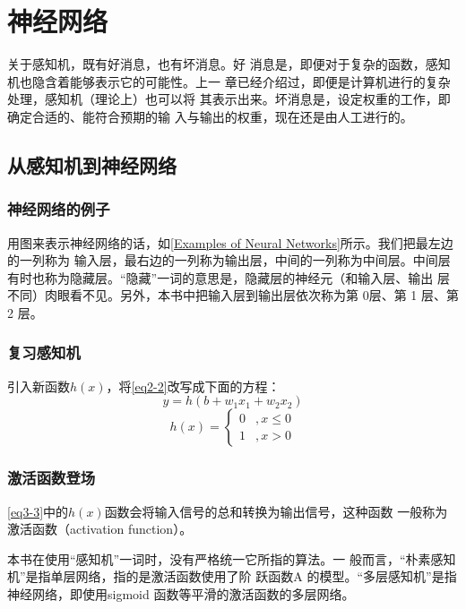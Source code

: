 \chapter{神经网络}
关于感知机，既有好消息，也有坏消息。好
消息是，即便对于复杂的函数，感知机也隐含着能够表示它的可能性。上一
章已经介绍过，即便是计算机进行的复杂处理，感知机（理论上）也可以将
其表示出来。坏消息是，设定权重的工作，即确定合适的、能符合预期的输
入与输出的权重，现在还是由人工进行的。
\section{从感知机到神经网络}
\subsection{神经网络的例子}
用图来表示神经网络的话，如\autoref{Examples of Neural Networks}所示。我们把最左边的一列称为
输入层，最右边的一列称为输出层，中间的一列称为中间层。中间层有时也称为隐藏层。“隐藏”一词的意思是，隐藏层的神经元（和输入层、输出
层不同）肉眼看不见。另外，本书中把输入层到输出层依次称为第 0层、第
1 层、第2 层。

\subsection{复习感知机}
引入新函数$h(x)$，将\autoref{eq2-2}改写成下面的方程：
\begin{equation}
    y=h(b+w_1x_1+w_2x_2)
\end{equation}
\begin{equation}
    \label{eq3-3}
    h(x)=\left\{
    \begin{array}{ll}
        0 & ,x\leq 0 \\
        1 & ,x>0
    \end{array}
    \right.
\end{equation}
\subsection{激活函数登场}
\autoref{eq3-3}中的$h(x)$函数会将输入信号的总和转换为输出信号，这种函数
一般称为激活函数（activation function）。
\begin{tcolorbox}
    本书在使用“感知机”一词时，没有严格统一它所指的算法。一
    般而言，“朴素感知机”是指单层网络，指的是激活函数使用了阶
    跃函数A 的模型。“多层感知机”是指神经网络，即使用sigmoid
    函数等平滑的激活函数的多层网络。
\end{tcolorbox}

